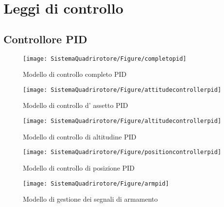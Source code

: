 \section{Leggi di controllo}
\subsection{Controllore PID}

\begin{figure}
	\centering
	\texttt{[image: SistemaQuadrirotore/Figure/completopid]}
	\caption{Modello di controllo completo PID}
\end{figure}

\begin{figure}
	\centering
	\texttt{[image: SistemaQuadrirotore/Figure/attitudecontrollerpid]}
	\caption{Modello di controllo d' assetto PID}
\end{figure}

\begin{figure}
	\centering
	\texttt{[image: SistemaQuadrirotore/Figure/altitudecontrollerpid]}
	\caption{Modello di controllo di altitudine PID}
\end{figure}

\begin{figure}
	\centering
	\texttt{[image: SistemaQuadrirotore/Figure/positioncontrollerpid]}
	\caption{Modello di controllo di posizione PID}
\end{figure}

\begin{figure}
	\centering
	\texttt{[image: SistemaQuadrirotore/Figure/armpid]}
	\caption{Modello di gestione dei segnali di armamento}
\end{figure}